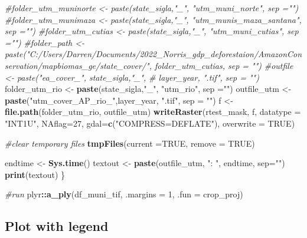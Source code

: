 \documentclass[
]{article}
\newenvironment{Shaded}{\begin{snugshade}}{\end{snugshade}}
\newcommand{\AttributeTok}[1]{\textcolor[rgb]{0.13,0.29,0.53}{#1}}
\newcommand{\CommentTok}[1]{\textcolor[rgb]{0.56,0.35,0.01}{\textit{#1}}}
\newcommand{\ConstantTok}[1]{\textcolor[rgb]{0.56,0.35,0.01}{#1}}
\newcommand{\DecValTok}[1]{\textcolor[rgb]{0.00,0.00,0.81}{#1}}
\newcommand{\FunctionTok}[1]{\textcolor[rgb]{0.13,0.29,0.53}{\textbf{#1}}}
\newcommand{\NormalTok}[1]{#1}
\newcommand{\OtherTok}[1]{\textcolor[rgb]{0.56,0.35,0.01}{#1}}
\newcommand{\SpecialCharTok}[1]{\textcolor[rgb]{0.81,0.36,0.00}{\textbf{#1}}}
\newcommand{\StringTok}[1]{\textcolor[rgb]{0.31,0.60,0.02}{#1}}
\begin{document}
\begin{Shaded}
\begin{Highlighting}[]
  \CommentTok{\#folder\_utm\_muninorte \textless{}{-} paste(state\_sigla,"\_", "utm\_muni\_norte", sep ="")}
  \CommentTok{\#folder\_utm\_munimaza \textless{}{-} paste(state\_sigla,"\_", "utm\_munis\_maza\_santana", sep ="")}
  \CommentTok{\#folder\_utm\_cutias \textless{}{-} paste(state\_sigla,"\_", "utm\_muni\_cutias", sep ="")}
  \CommentTok{\#folder\_path \textless{}{-} paste("C:/Users/Darren/Documents/2022\_Norris\_gdp\_deforestaion/AmazonConservation/mapbiomas\_ge/state\_cover/", folder\_utm\_cutias, sep = "")}
  \CommentTok{\#outfile \textless{}{-} paste("ea\_cover\_", state\_sigla,"\_", }
  \CommentTok{\#                 layer\_year, ".tif", sep = "")}
\NormalTok{  folder\_utm\_rio }\OtherTok{\textless{}{-}} \FunctionTok{paste}\NormalTok{(state\_sigla,}\StringTok{"\_"}\NormalTok{, }\StringTok{"utm\_rio"}\NormalTok{, }\AttributeTok{sep =}\StringTok{""}\NormalTok{)}
\NormalTok{  outfile\_utm }\OtherTok{\textless{}{-}} \FunctionTok{paste}\NormalTok{(}\StringTok{"utm\_cover\_AP\_rio\_"}\NormalTok{,layer\_year, }\StringTok{".tif"}\NormalTok{, }\AttributeTok{sep =} \StringTok{""}\NormalTok{)}
\NormalTok{  f }\OtherTok{\textless{}{-}} \FunctionTok{file.path}\NormalTok{(folder\_utm\_rio, outfile\_utm)}
  \FunctionTok{writeRaster}\NormalTok{(rtest\_mask, f, }\AttributeTok{datatype =} \StringTok{"INT1U"}\NormalTok{, }\AttributeTok{NAflag=}\DecValTok{27}\NormalTok{, }
              \AttributeTok{gdal=}\FunctionTok{c}\NormalTok{(}\StringTok{"COMPRESS=DEFLATE"}\NormalTok{), }\AttributeTok{overwrite =} \ConstantTok{TRUE}\NormalTok{)}
  
  \CommentTok{\#clear temporary files}
  \FunctionTok{tmpFiles}\NormalTok{(}\AttributeTok{current =}\ConstantTok{TRUE}\NormalTok{, }\AttributeTok{remove =} \ConstantTok{TRUE}\NormalTok{) }
  
\NormalTok{  endtime }\OtherTok{\textless{}{-}} \FunctionTok{Sys.time}\NormalTok{() }
\NormalTok{  textout }\OtherTok{\textless{}{-}} \FunctionTok{paste}\NormalTok{(outfile\_utm, }\StringTok{": "}\NormalTok{, endtime, }\AttributeTok{sep=}\StringTok{""}\NormalTok{)}
  \FunctionTok{print}\NormalTok{(textout)}
\NormalTok{\}}

\CommentTok{\#run }
\NormalTok{plyr}\SpecialCharTok{::}\FunctionTok{a\_ply}\NormalTok{(df\_muni\_tif, }\AttributeTok{.margins =} \DecValTok{1}\NormalTok{, }
            \AttributeTok{.fun =}\NormalTok{ crop\_proj)}
\end{Highlighting}
\end{Shaded}

\hypertarget{plot-with-legend}{%
\subsection{Plot with legend}\label{plot-with-legend}}
\end{document}
